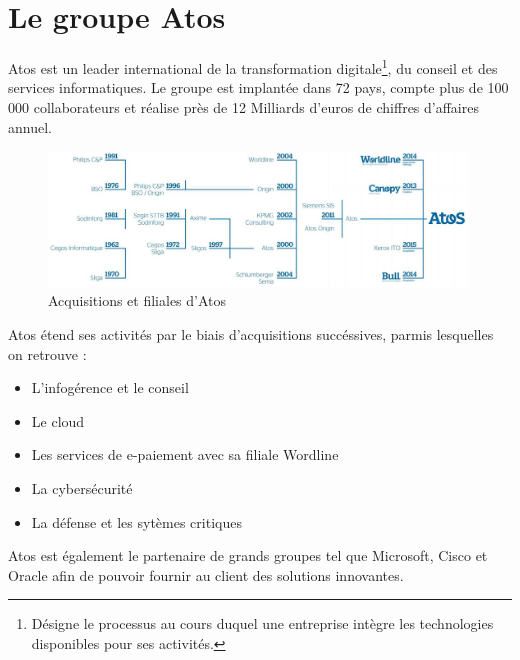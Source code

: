 \documentclass[12pt]{report}
\begin{document}
	\newpage
	
	\section{Le groupe Atos}
	Atos est un leader international de la transformation digitale\footnote{Désigne le processus au cours duquel une entreprise intègre les technologies disponibles pour ses activités.}, du conseil et des services informatiques.
	Le groupe est implantée dans 72 pays, compte plus de 100 000 collaborateurs et réalise près de 12 Milliards d'euros de chiffres d'affaires annuel.
	
	\begin{figure}[ht]
	    \centering
	    \includegraphics[width=0.99\textwidth]{img/Atos_acquisition_filiale.png}
	    \caption{Acquisitions et filiales d'Atos\cite{TweetAtosAcquisition}}
	    \label{fig:atos_acquisition}
	\end{figure}
	
	Atos étend ses activités par le biais d'acquisitions succéssives, parmis lesquelles on retrouve :\vspace{-1.5em}
	\begin{itemize}[itemsep=-0.5em]
	    \item L'infogérence et le conseil
	    \item Le cloud
	    \item Les services de e-paiement avec sa filiale Wordline
	    \item La cybersécurité
	    \item La défense et les sytèmes critiques
	\end{itemize}
	
	Atos est également le partenaire de grands groupes tel que Microsoft, Cisco et Oracle afin de pouvoir fournir au client des solutions innovantes.
	
	\newpage
	
\end{document}
